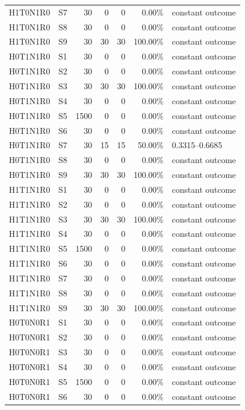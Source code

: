 \begin{tabular}{llrrrrl}
H1T0N1R0 & S7 & 30 & 0 & 0 & 0.00\% & constant outcome \\
H1T0N1R0 & S8 & 30 & 0 & 0 & 0.00\% & constant outcome \\
H1T0N1R0 & S9 & 30 & 30 & 30 & 100.00\% & constant outcome \\
H0T1N1R0 & S1 & 30 & 0 & 0 & 0.00\% & constant outcome \\
H0T1N1R0 & S2 & 30 & 0 & 0 & 0.00\% & constant outcome \\
H0T1N1R0 & S3 & 30 & 30 & 30 & 100.00\% & constant outcome \\
H0T1N1R0 & S4 & 30 & 0 & 0 & 0.00\% & constant outcome \\
H0T1N1R0 & S5 & 1500 & 0 & 0 & 0.00\% & constant outcome \\
H0T1N1R0 & S6 & 30 & 0 & 0 & 0.00\% & constant outcome \\
H0T1N1R0 & S7 & 30 & 15 & 15 & 50.00\% & 0.3315--0.6685 \\
H0T1N1R0 & S8 & 30 & 0 & 0 & 0.00\% & constant outcome \\
H0T1N1R0 & S9 & 30 & 30 & 30 & 100.00\% & constant outcome \\
H1T1N1R0 & S1 & 30 & 0 & 0 & 0.00\% & constant outcome \\
H1T1N1R0 & S2 & 30 & 0 & 0 & 0.00\% & constant outcome \\
H1T1N1R0 & S3 & 30 & 30 & 30 & 100.00\% & constant outcome \\
H1T1N1R0 & S4 & 30 & 0 & 0 & 0.00\% & constant outcome \\
H1T1N1R0 & S5 & 1500 & 0 & 0 & 0.00\% & constant outcome \\
H1T1N1R0 & S6 & 30 & 0 & 0 & 0.00\% & constant outcome \\
H1T1N1R0 & S7 & 30 & 0 & 0 & 0.00\% & constant outcome \\
H1T1N1R0 & S8 & 30 & 0 & 0 & 0.00\% & constant outcome \\
H1T1N1R0 & S9 & 30 & 30 & 30 & 100.00\% & constant outcome \\
H0T0N0R1 & S1 & 30 & 0 & 0 & 0.00\% & constant outcome \\
H0T0N0R1 & S2 & 30 & 0 & 0 & 0.00\% & constant outcome \\
H0T0N0R1 & S3 & 30 & 0 & 0 & 0.00\% & constant outcome \\
H0T0N0R1 & S4 & 30 & 0 & 0 & 0.00\% & constant outcome \\
H0T0N0R1 & S5 & 1500 & 0 & 0 & 0.00\% & constant outcome \\
H0T0N0R1 & S6 & 30 & 0 & 0 & 0.00\% & constant outcome \\

\end{tabular}
